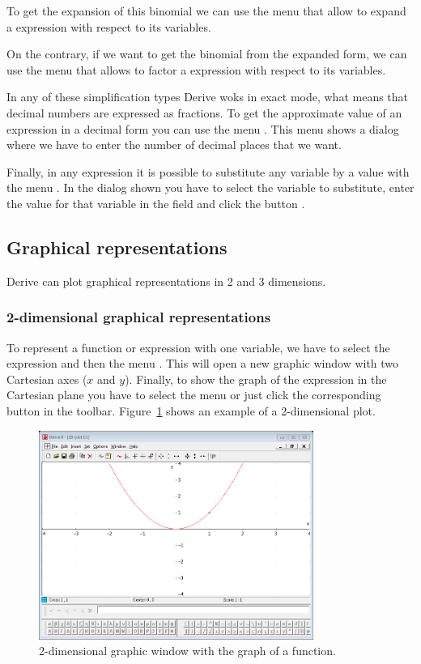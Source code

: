 To get the expansion of this binomial we can use the menu  that allow to expand a expression with respect to its variables.

On the contrary, if we want to get the binomial from the expanded form, we can use the menu  that allows to factor a expression with respect to its variables.

In any of these simplification types Derive woks in exact mode, what means that decimal numbers are expressed as fractions. 
To get the approximate value of an expression in a decimal form you can use the menu . 
This menu shows a dialog where we have to enter the number of decimal places that we want.

Finally, in any expression it is possible to substitute any variable by a value with the menu .
In the dialog shown you have to select the variable to substitute, enter the value for that variable in the field  and click the button .


\subsection*{Graphical representations}
Derive can plot graphical representations in 2 and 3 dimensions.

\subsubsection*{2-dimensional graphical representations}
To represent a function or expression with one variable, we have to select the expression and then the menu .
This will open a new graphic window with two Cartesian axes ($x$ and $y$).
Finally, to show the graph of the expression in the Cartesian plane you have to select the menu  or just click the corresponding button in the toolbar. 
Figure~\ref{g:2d-plot} shows an example of a 2-dimensional plot.

\begin{figure}[h!]
\begin{center}
\includegraphics[width=0.8\textwidth]{img/introduction/2d-plot}
\caption{2-dimensional graphic window with the graph of a function.}
\label{g:2d-plot}
\end{center}
\end{figure}

